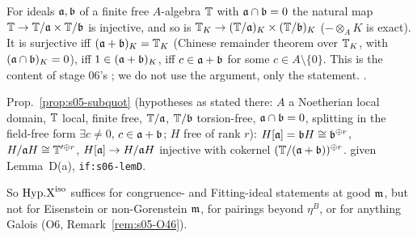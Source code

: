 \begin{remark}\label{rem:s05-split}
For ideals $\mathfrak{a},\mathfrak{b}$ of a finite free $A$-algebra $\mathbb{T}$ with $\mathfrak{a}\cap\mathfrak{b}=0$ the natural map $\mathbb{T}\to\mathbb{T}/\mathfrak{a}\times\mathbb{T}/\mathfrak{b}$ is injective, and so is
$\mathbb{T}_K\to(\mathbb{T}/\mathfrak{a})_K\times(\mathbb{T}/\mathfrak{b})_K$ ($-\otimes_AK$ is exact). It is surjective iff $(\mathfrak{a}+\mathfrak{b})_K=\mathbb{T}_K$ (Chinese remainder theorem over $\mathbb{T}_K$,
with $(\mathfrak{a}\cap\mathfrak{b})_K=0$), iff $1\in(\mathfrak{a}+\mathfrak{b})_K$, iff $c\in\mathfrak{a}+\mathfrak{b}$ for some $c\in A\setminus\{0\}$. This is the content of stage 06's
; we do not use the argument, only the statement. \stproved.
\end{remark}

\begin{interface}\label{if:s05-subquot}
Prop.~\ref{prop:s05-subquot} (hypotheses as stated there: $A$ a Noetherian local domain, $\mathbb{T}$ local, finite free, $\mathbb{T}/\mathfrak{a}$, $\mathbb{T}/\mathfrak{b}$
torsion-free, $\mathfrak{a}\cap\mathfrak{b}=0$, splitting in the field-free form $\exists c\ne0$, $c\in\mathfrak{a}+\mathfrak{b}$; $H$ free of rank $r$): $H[\mathfrak{a}]=\mathfrak{b} H\cong\mathfrak{b}^{\oplus r}$,
$H/\mathfrak{a} H\cong\mathbb{T}'^{\oplus r}$, $H[\mathfrak{a}]\to H/\mathfrak{a} H$ injective with cokernel $(\mathbb{T}/(\mathfrak{a}+\mathfrak{b}))^{\oplus r}$. \stproved{} given Lemma~D(a),
\texttt{if:s06-lemD}.
\end{interface}
\noindent So $\mathrm{Hyp.X}^{\mathrm{iso}}$ suffices for congruence- and Fitting-ideal statements at good $\mathfrak{m}$, but not for Eisenstein or non-Gorenstein
$\mathfrak{m}$, for pairings beyond $\eta^B$, or for anything Galois (O6, Remark~\ref{rem:s05-O46}).

